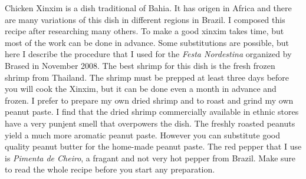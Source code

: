 \documentclass[11pt,letterpaper]{article}
\begin{document}


Chicken Xinxim is a dish traditional of Bahia. It has origen in Africa
and there are many variations of this dish in different regions in
Brazil. I composed this recipe after researching many others. To make
a good xinxim takes time, but most of the work can be done in
advance. Some substitutions are possible, but here I describe the
procedure that I used for the {\em Festa Nordestina} organized by
Brased in November 2008. The best shrimp for this dish is the fresh
frozen shrimp from Thailand. The shrimp must be prepped at least three
days before you will cook the Xinxim, but it can be done even a month
in advance and frozen. I prefer to prepare my own dried shrimp and to
roast and grind my own peanut paste. I find that the dried shrimp
commercially available in ethnic stores have a very punjent smell that
overpowers the dish. The freshly roasted peanuts yield a much more
aromatic peanut paste. However you can substitute good quality peanut
butter for the home-made peanut paste. The red pepper that I use is
{\em Pimenta de Cheiro}, a fragant and not very hot pepper from
Brazil. Make sure to read the whole recipe before you start any
preparation.
\end{document}
